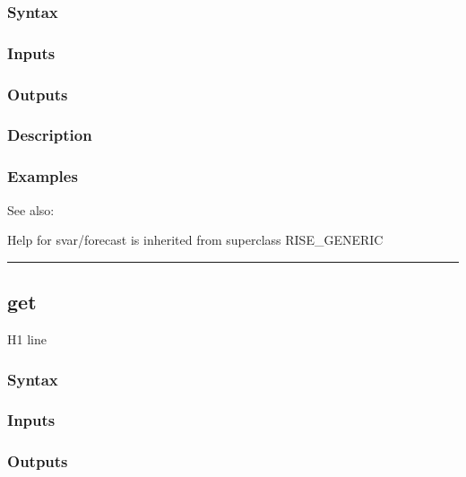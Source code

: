 \documentclass[letterpaper,10pt,english]{sphinxmanual}
\begin{document}
\subsubsection{Syntax}
\label{classes/models/@svar/svar:id15}

\subsubsection{Inputs}
\label{classes/models/@svar/svar:id16}

\subsubsection{Outputs}
\label{classes/models/@svar/svar:id17}

\subsubsection{Description}
\label{classes/models/@svar/svar:id18}

\subsubsection{Examples}
\label{classes/models/@svar/svar:id19}
See also:

Help for svar/forecast is inherited from superclass RISE\_GENERIC


\bigskip\hrule{}\bigskip



\subsection{get}
\label{classes/models/@svar/svar:id20}\label{classes/models/@svar/svar:get}
H1 line


\subsubsection{Syntax}
\label{classes/models/@svar/svar:id21}

\subsubsection{Inputs}
\label{classes/models/@svar/svar:id22}

\subsubsection{Outputs}
\label{classes/models/@svar/svar:id23}
\end{document}
